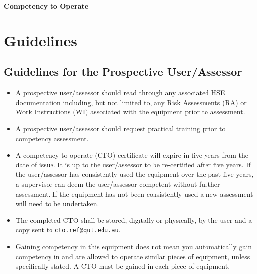 \documentclass[11pt, a4paper, titlepage]{article}
\begin{document}
    \noindent
    \huge{\textbf{Competency to Operate}} \\
    \huge{\textbf{\Title}}

    \normalsize
    \section{Guidelines}
    \subsection{Guidelines for the Prospective User/Assessor}
    \begin{itemize}[noitemsep]
        \item A prospective user/assessor should read through any associated HSE documentation including, but not limited to, any Risk Assessments (RA) or Work Instructions (WI) associated with the equipment prior to assessment.
        \item A prospective user/assessor should request practical training prior to competency assessment.
        \item A competency to operate (CTO) certificate will expire in five years from the date of issue. It is up to the user/assessor to be re-certified after five years. If the user/assessor has consistently used the equipment over the past five years, a supervisor can deem the user/assessor competent without further assessment. If the equipment has not been consistently used a new assessment will need to be undertaken.
        \item The completed CTO shall be stored, digitally or physically, by the user and a copy sent to \texttt{cto.ref@qut.edu.au}.
        \item Gaining competency in this equipment does not mean you automatically gain competency in and are allowed to operate similar pieces of equipment, unless specifically stated. A CTO must be gained in each piece of equipment.
    \end{itemize}
\end{document}
